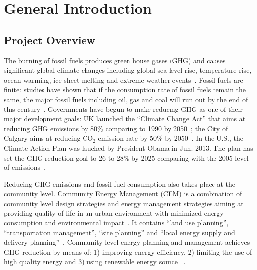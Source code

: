 
\chapter{General Introduction} %

\label{Chapter1} %



\section{Project Overview}
The burning of fossil fuels produces green house gases (GHG) and
causes significant global climate changes including global sea level
rise, temperature rise, ocean warming, ice sheet melting and extreme
weather events~\cite{NASA2015}. Fossil fuels are finite: studies have
shown that if the consumption rate of fossil fuels remain the same, the
major fossil fuels including oil, gas and coal will run out by the end
of this century~\cite{Ecotricity2015, Kathryn2015}. Governments have
begun to make reducing GHG as one of their major development goals: UK
launched the ``Climate Change Act'' that aims at reducing GHG
emissions by 80\% comparing to 1990 by 2050~\cite{carbonBudgetUK}; the
City of Calgary aims at reducing CO$_2$ emission rate by 50\% by
2050~\cite{aacip2009}. In the U.S., the Climate Action Plan was
lauched by President Obama in Jun. 2013. The plan has set the GHG
reduction goal to 26 to 28\% by 2025 comparing with the 2005 level of
emissions~\cite{ghgReduce2014}.

Reducing GHG emissions and fossil fuel consumption also takes place at
the community level. Community Energy Management (CEM) is a
combination of community level design strategies and energy management
strategies aiming at providing quality of life in an urban environment
with minimized energy consumption and environmental
impact~\cite{Jaccard19971065}. It contains ``land use planning'',
``transportation management'', ``site planning'' and ``local energy
supply and delivery planning''~\cite{Jaccard19971065}. Community level
energy planning and management achieves GHG reduction by means of: 1)
improving energy efficiency, 2) limiting the use of high quality
energy and 3) using renewable energy source ~\cite{StDenis20092088}.

